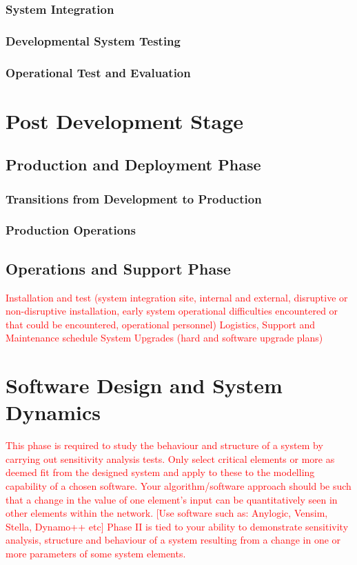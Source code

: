 \documentclass[a4paper,11pt,fleqn]{report}
\begin{document}
\subsection{System Integration}

\subsection{Developmental System Testing}

\subsection{Operational Test and Evaluation}

\chapter{Post Development Stage}

\section{Production and Deployment Phase}

\subsection{Transitions from Development to Production}

\subsection{Production Operations}

\section{Operations and Support Phase}
\textcolor{red}{Installation and test (system integration site, internal and external, disruptive or non-disruptive installation, early system operational difficulties encountered or that could be encountered, operational personnel)
Logistics, Support and Maintenance schedule
System Upgrades (hard and software upgrade plans)}

\chapter{Software Design and System Dynamics}
\textcolor{red}{This phase is required to study the behaviour and structure of a system by carrying out sensitivity analysis tests. Only select critical elements or more as deemed fit from the designed system and apply to these to the modelling capability of a chosen software.
Your algorithm/software approach should be such that a change in the value of one element’s input can be quantitatively seen in other elements within the network. [Use software such as: Anylogic, Vensim, Stella, Dynamo++ etc]
Phase II is tied to your ability to demonstrate sensitivity analysis, structure and behaviour of a system resulting from a change in one or more parameters of some system elements.}
\end{document}
